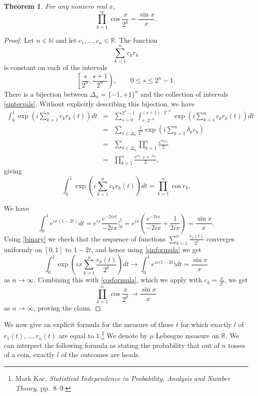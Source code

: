 \documentclass{article}
\newtheorem{theorem}{Theorem}
\theoremstyle{definition}
\begin{document}
\begin{theorem} For any nonzero real $x$,
\[
 \prod_{k=1}^\infty \cos \frac{x}{2^k} = \frac{\sin x}{x}.
\]
\end{theorem}
\begin{proof}
Let $n \in \mathbb{N}$ and let $c_1,\ldots,c_n \in \mathbb{R}$. 
The function
\[
\sum_{k=1}^n c_k r_k
\]
is constant on each of the intervals
 \begin{equation}
 \left[\frac{s}{2^n},\frac{s+1}{2^n} \right), \qquad 0 \leq s \leq 2^n-1.
 \label{sintervals}
 \end{equation}
 There is a bijection between  $\Delta_n=\{-1,+1\}^n$
 and 
the collection of intervals \eqref{sintervals}. Without explicitly describing this bijection,
we have
\begin{eqnarray*}
\int_0^1 \exp\left(i\sum_{k=1}^n c_k r_k(t) \right) dt &=& 
\sum_{s=0}^{2^n-1} \int_{s\cdot 2^{-n}}^{(s+1)\cdot 2^{-n}} 
\exp\left(i\sum_{k=1}^n c_k r_k(t) \right) dt\\
&=&\sum_{\delta \in \Delta_n} \frac{1}{2^n}  \exp\left(i\sum_{k=1}^n \delta_k c_k \right)\\
&=&\sum_{\delta \in \Delta_n} \prod_{k=1}^n \frac{e^{i\delta_kc_k}}{2}\\
&=&\prod_{k=1}^n \frac{e^{ic_k}+e^{-ic_k}}{2},
\end{eqnarray*}
giving
\begin{equation}
\int_0^1 \exp\left(i\sum_{k=1}^n c_k r_k(t) \right) dt =\prod_{k=1}^n \cos c_k.
\label{cosformula}
\end{equation}

We have
\begin{equation}
\int_0^1 e^{ix(1-2t)} dt  = e^{ix} \frac{e^{-2ixt}}{-2ix} \bigg|_0^1
 = e^{ix} \left(\frac{e^{-2ix}}{-2ix} + \frac{1}{2ix} \right)
 =\frac{\sin x}{x}.
 \label{sinformula}
\end{equation}
Using \eqref{binary} we check that
the sequence of functions $\sum_{k=1}^n \frac{r_k(t)}{2^k}$ converges uniformly on $[0,1]$
to $1-2t$, and hence using \eqref{sinformula} we get
\[
\int_0^1 \exp\left(ix \sum_{k=1}^n  \frac{r_k(t)}{2^k} \right) dt \to \int_0^1 e^{ix(1-2t}) dt
=\frac{\sin x}{x}
\]
as $n \to \infty$. Combining this with \eqref{cosformula}, which we apply with $c_k=\frac{x}{2^k}$,  we get
\[
 \prod_{k=1}^n \cos \frac{x}{2^k} \to \frac{\sin x}{x}
\]
as $n \to \infty$, proving the claim.
\end{proof}

We now give an explicit formula for the measure of those $t$ for which exactly $l$ of $r_1(t),\ldots,r_n(t)$ are equal to $1$.\footnote{Mark Kac, {\em Statistical Independence in Probability, Analysis and Number Theory}, pp.~8--9.}
We denote by $\mu$ Lebesgue measure on $\mathbb{R}$. We can interpret the following formula as stating the probability that out of $n$
tosses of a coin, exactly $l$ of the outcomes are heads. 
\end{document}

